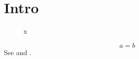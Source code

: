 \documentclass{article}
\begin{document}
\section{Intro}\label{intro}
\begin{figure}\caption{x}\label{fig}\end{figure}
\begin{equation*} a=b \end{equation*}
See  and .
\end{document}
